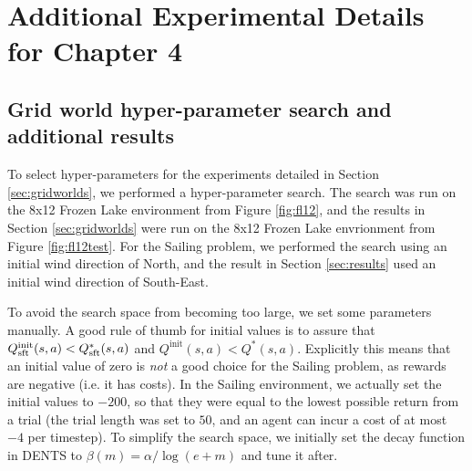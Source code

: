 %

\chapter{\label{app:go-results}\label{app:expr-deets-ch4}Additional Experimental Details for Chapter 4}




\section{Grid world hyper-parameter search and additional results} 
\label{appsec:hps}


    To select hyper-parameters for the experiments detailed in Section \ref{sec:gridworlds}, we performed a hyper-parameter search. The search was run on the 8x12 Frozen Lake environment from Figure \ref{fig:fl12}, and the results in Section \ref{sec:gridworlds} were run on the 8x12 Frozen Lake envrionment from Figure \ref{fig:fl12test}. For the Sailing problem, we performed the search using an initial wind direction of North, and the result in Section \ref{sec:results} used an initial wind direction of South-East.

    To avoid the search space from becoming too large, we set some parameters manually. A good rule of thumb for initial values is to assure that $Q^{\text{init}}_{\text{sft}}(s,a) < Q_{{\textnormal{sft}}}^*(s,a)$ and $Q^{\text{init}}(s,a) < Q^*(s,a)$. Explicitly this means that an initial value of zero is \textit{not} a good choice for the Sailing problem, as rewards are negative (i.e. it has costs). In the Sailing environment, we actually set the initial values to $-200$, so that they were equal to the lowest possible return from a trial (the trial length was set to $50$, and an agent can incur a cost of at most $-4$ per timestep). To simplify the search space, we initially set the decay function in DENTS to $\beta(m)=\alpha/\log(e+m)$ and tune it after. 

